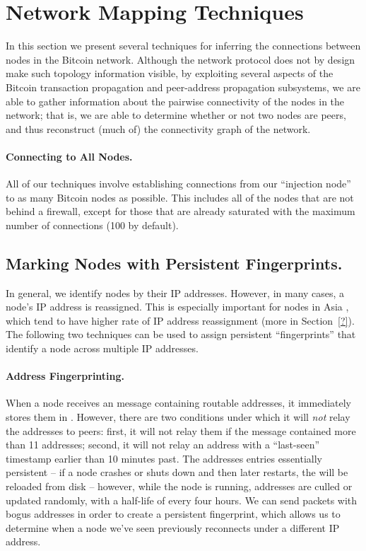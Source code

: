 \section{Network Mapping Techniques}

In this section we present several techniques for inferring the connections between nodes in the Bitcoin network.
Although the network protocol does not by design make such topology information visible, by exploiting several aspects of the Bitcoin transaction propagation and peer-address propagation subsystems, we are able to gather information about the pairwise connectivity of the nodes in the network; that is, we are able to determine whether or not two nodes are peers, and thus reconstruct (much of) the connectivity graph of the network.

\paragraph{Connecting to All Nodes.}
All of our techniques involve establishing connections from our ``injection node'' to as many Bitcoin nodes as possible. This includes all of the nodes that are not behind a firewall, except for those that are already saturated with the maximum number of connections (100 by default).





\subsection{Marking Nodes with Persistent Fingerprints.}
In general, we identify nodes by their IP addresses. However, in many cases, a node's IP address is reassigned. This is especially important for nodes in Asia , which tend to have higher rate of IP address reassignment (more in Section~\ref{?}). The following two techniques can be used to assign persistent ``fingerprints'' that identify a node across multiple IP addresses.

\paragraph{Address Fingerprinting.}
When a node receives an  message containing routable addresses, it immediately stores them in . However, there are two conditions under which it will \emph{not} relay the addresses to peers: first, it will not relay them if the  message contained more than 11 addresses; second, it will not relay an address with a ``last-seen'' timestamp earlier than 10  minutes past.
The addresses entries essentially persistent -- if a node crashes or shuts down and then later restarts, the  will be reloaded from disk -- however, while the node is running, addresses are culled or updated randomly, with a half-life of every four hours.  We can send  packets with bogus addresses in order to create a persistent fingerprint, which allows us to determine when a node we've seen previously reconnects under a different IP address. 

